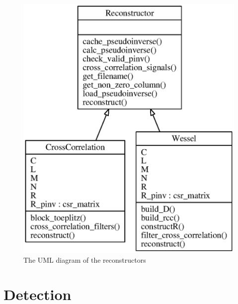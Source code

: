 \documentclass[a4paper, openany, oneside]{memoir}
\begin{document}
\begin{figure}
    \centering
    \includegraphics{./figures/classes_reconstruction.eps}
    \caption{The UML diagram of the reconstructors}
    \label{fig:umlreconstructor}
\end{figure}

\section{Detection}
\label{sec:detection}
\end{document}
